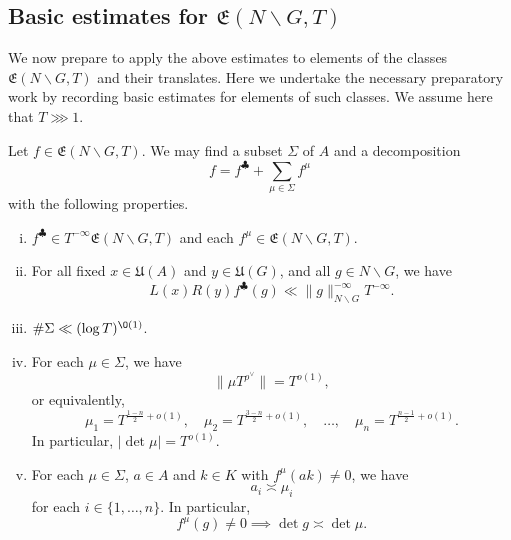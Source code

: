 \subsection{Basic estimates for $\mathfrak{E}(N \backslash G, T)$}\label{sec:cnq7s0k2or}
We now prepare to apply the above estimates to elements of the classes $\mathfrak{E}(N \backslash G, T)$ and their translates.  Here we undertake the necessary preparatory work by recording basic estimates for elements of such classes.  We assume here that $T \ggg 1$.

\begin{lemma}\label{lem:standard:let-f-in-2}
  Let $f \in \mathfrak{E}(N \backslash G, T)$.  We may find a subset $\Sigma$ of $A$ and a decomposition
  \begin{equation}\label{eq:f-=-fclubsuit}
    f = f^{\clubsuit} + \sum_{\mu \in \Sigma } f^{\mu}
  \end{equation}
  with the following properties.
  \begin{enumerate}[(i)]
  \item $f^{\clubsuit} \in T^{-\infty}\mathfrak{E}(N \backslash G, T)$ and each $f^{\mu} \in \mathfrak{E}(N \backslash G, T)$.
  \item \label{itm:standard:clubsuit-2} For all fixed $x \in \mathfrak{U}(A)$ and $y \in \mathfrak{U}(G)$, and all $g \in N \backslash G$, we have
    \begin{equation*}
      L(x) R(y) f^{\clubsuit}(g) \ll \|g\|_{N \backslash G}^{-\infty} T^{-\infty}.
    \end{equation*}
  \item \label{itm:standard:decomposition-support-3} $\# \Sigma \ll (\log T)^{\O(1)}$.
  \item \label{itm:standard:decomposition-support-4} For each $\mu \in \Sigma$, we have
    \begin{equation*}
      \|\mu T^{\rho^\vee}\| = T^{o(1)},
    \end{equation*}
    or equivalently,
    \begin{equation}\label{eq:mu_1-=-tfrac1}
      \mu_1 = T^{\frac{1-n}{2} + o(1)}, \quad
      \mu_2 = T^{\frac{3-n}{2} + o(1)},
      \quad
      \dotsc,
      \quad
      \mu_n = T^{\frac{n-1}{2} + o(1)}.
    \end{equation}
    In particular, $|\det \mu| = T^{o(1)}$.
  \item \label{itm:standard:decomposition-support-5} For each $\mu \in \Sigma$, $a \in A$ and $k \in K$ with $f^{\mu}(a k) \neq 0$, we have
    \begin{equation*}
      a_i \asymp \mu_i
    \end{equation*}
    for each $i \in \{1, \dotsc, n\}$.  In particular,
    \begin{equation*}
      f^{\mu}(g) \neq 0 \implies \det g \asymp \det \mu.
    \end{equation*}
  \end{enumerate}
\end{lemma}
